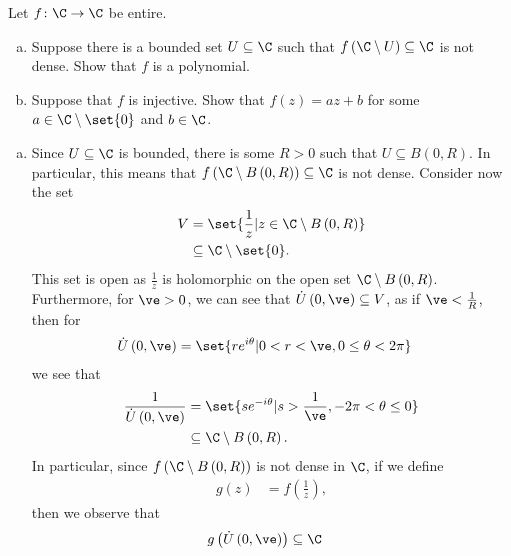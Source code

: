 \documentclass[10pt]{mypackage}
\begin{document}
\begin{problem}[Problem 2]
  Let $f\colon \C\rightarrow \C$ be entire.
  \begin{enumerate}[(a)]
    \item Suppose there is a bounded set $U\subseteq \C$ such that $f\left( \C\setminus U \right)\subseteq \C$ is not dense. Show that $f$ is a polynomial.
    \item Suppose that $f$ is injective. Show that $f(z) = az + b$ for some $a\in \C\setminus \set{0}$ and $b\in \C$.
  \end{enumerate}
\end{problem}
\begin{solution}\hfill
  \begin{enumerate}[(a)]
    \item Since $U\subseteq \C$ is bounded, there is some $R > 0$ such that $U\subseteq B\left( 0,R \right)$. In particular, this means that $f\left( \C\setminus B\left( 0,R \right) \right)\subseteq \C$ is not dense. Consider now the set
      \begin{align*}
        V &= \set{\frac{1}{z} | z\in \C\setminus B\left( 0,R \right)}\\
          &\subseteq \C\setminus \set{0}.
      \end{align*}
      This set is open as $\frac{1}{z}$ is holomorphic on the open set $\C\setminus B\left( 0,R \right)$. Furthermore, for $\ve > 0$, we can see that $\dot{U}\left( 0,\ve \right)\subseteq V$, as if $\ve < \frac{1}{R}$, then for
      \begin{align*}
        \dot{U}\left( 0,\ve \right) &= \set{re^{i\theta} | 0 < r < \ve,0 \leq \theta < 2\pi}
      \end{align*}
      we see that
      \begin{align*}
        \frac{1}{\dot{U}\left( 0,\ve \right)} &= \set{se^{-i\theta} | s > \frac{1}{\ve},-2\pi < \theta\leq 0 }\\
                                              &\subseteq \C\setminus B\left( 0,R \right).
      \end{align*}
      In particular, since $f\left( \C\setminus B\left( 0,R \right) \right)$ is not dense in $\C$, if we define
      \begin{align*}
        g(z) &= f\left( \frac{1}{z} \right),
      \end{align*}
      then we observe that
      \begin{align*}
        g\left( \dot{U}\left( 0,\ve \right) \right) &\subseteq \C
      \end{align*}

\end{enumerate}
\end{solution}
\end{document}
